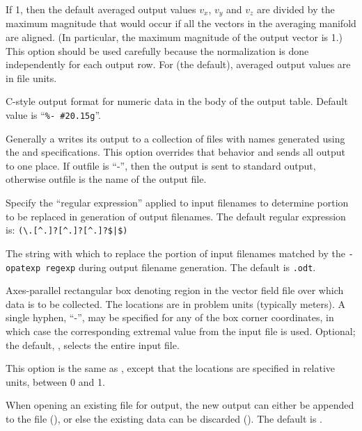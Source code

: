 \begin{description}
  If 1, then the default averaged output values $v_x$, $v_y$ and $v_z$
  are divided by the maximum magnitude that would occur if all the
  vectors in the averaging manifold are aligned.  (In particular, the
  maximum magnitude of the output vector is 1.)  This option should
  be used carefully because the normalization is done independently for
  each output row.  For 
  (the default), averaged output values are in file units.
\item[\optkey{-numfmt fmt}]
  C-style output format for numeric data in the body of the output
  table.  Default value is ``\verb+%- #20.15g+''.
\item[\optkey{-onefile outfile}]
  Generally a  writes its output to a collection of files
  with names generated using the  and 
  specifications.  This option overrides that behavior and sends all
  output to one place.  If outfile is ``-'', then the output is sent
  to standard output, otherwise outfile is the name of the output file.
\item[\optkey{-opatexp regexp}]
  Specify the ``regular expression'' applied to input filenames to
  determine portion to be replaced in generation of output filenames.
  The default regular expression is: {\verb!(\.[^.]?[^.]?[^.]?$|$)!}
\item[\optkey{-opatsub sub}]
  The string with which to replace the portion of input filenames
  matched by the {\tt -opatexp regexp} during output filename
  generation.  The default is {\verb!.odt!}.
\item[\optkey{-region xmin ymin zmin xmax ymax zmax}]
  Axes-parallel rectangular box denoting region in the vector field
  file over which data is to be collected.  The locations are in
  problem units (typically meters).  A single hyphen, ``-'', may be
  specified for any of the box corner coordinates, in which case the
  corresponding extremal value from the input file is used.  Optional;
  the default, , selects the entire input file.
\item[\optkey{-rregion rxmin rymin rzmin rxmax rymax rzmax}]
  This option is the same as , except that the locations
  are specified in relative units, between 0 and 1.
\item[\optkey{-truncate \boa 0\pipe 1\bca}]
  When opening an existing file for output, the new output can either be
  appended to the file (), or else the existing data
  can be discarded ().  The default is .

\end{description}
